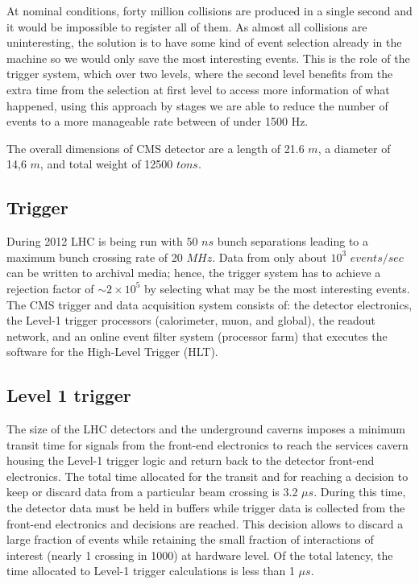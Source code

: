 \documentclass[%
reprint,
amsmath,
amssymb,
aps,
pra,
showkeys
]{revtex4-1}
\begin{document}
At nominal conditions, forty million collisions are produced in a single second and it would be impossible to
register all of them. As almost all collisions are uninteresting, the solution is to have some kind of event selection
already in the machine so we would only save the most interesting events. This is the role of the trigger system,
which over two levels, where the second level benefits from the extra time from the selection at first level to
access more information of what happened, using this approach by stages we are able to reduce the number of events 
to a more manageable rate between of under 1500 Hz.

The overall dimensions of CMS detector are a length of 21.6 $m$, a diameter of 14,6 $m$, and total weight of
12500 $tons$.

\subsection{Trigger}

During 2012 LHC is being run with $50$ $ns$ bunch separations leading to a maximum bunch crossing rate of 20 $MHz$. 
Data from only about $10^3$ $events/sec$ can be written to archival media; hence, the trigger system has to achieve a
rejection factor of $\sim 2 \times 10^5$ by selecting what may be the most interesting events. The CMS trigger and data 
acquisition system consists of: the detector electronics, the Level-1 trigger processors (calorimeter, muon, and global), 
the readout network, and an online event filter system (processor farm) that executes the software for the High-Level 
Trigger (HLT).

\subsection{Level 1 trigger}

The size of the LHC detectors and the underground caverns imposes a minimum transit time for signals from
the front-end electronics to reach the services cavern housing the Level-1 trigger logic and return back to the
detector front-end electronics. The total time allocated for the transit and for reaching a decision to keep or
discard data from a particular beam crossing is 3.2 $\mu s$. During this time, the detector data must be held in
buffers while trigger data is collected from the front-end electronics and decisions are reached. This decision
allows to discard a large fraction of events while retaining the small fraction of interactions of interest (nearly
1 crossing in 1000) at hardware level. Of the total latency, the time allocated to Level-1 trigger calculations
is less than 1 $\mu s$.
\end{document}

